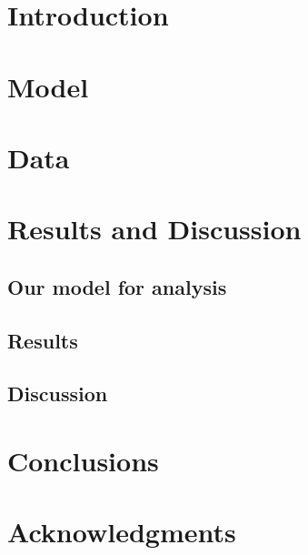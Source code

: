\documentclass{acm_proc_article-sp}
\begin{document}
\maketitle






\section{Introduction}


\section{Model}



\section{Data}
\label{sectionData}


\section{Results and Discussion}
\subsection{Our model for analysis}


\subsection{Results}


\subsection{Discussion}


\section{Conclusions}


\section{Acknowledgments}



%
%
\end{document}

